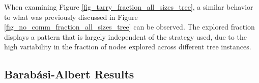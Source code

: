 When examining Figure \ref{fig_tarry_fraction_all_sizes_tree}, a similar behavior to what was previously discussed in Figure \ref{fig_no_comm_fraction_all_sizes_tree} can be observed. The explored fraction displays a pattern that is largely independent of the strategy used, due to the high variability in the fraction of nodes explored across different tree instances.

\subsection{Barabási-Albert Results} 
\label{subsection_tarry_barabasi_albert_results}

    
    
    
